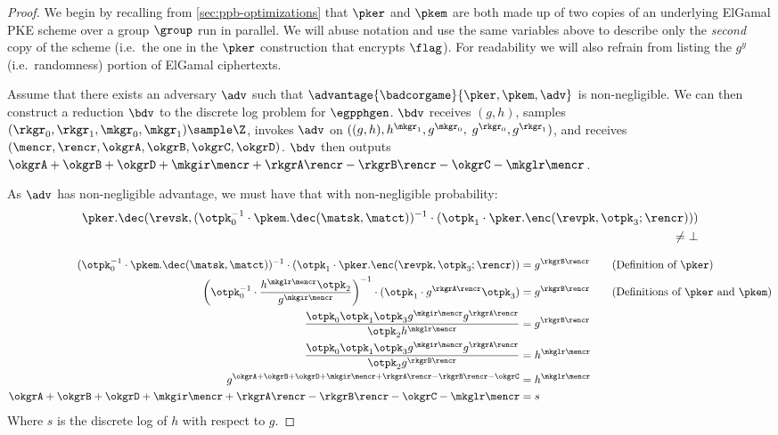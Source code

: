 \begin{proof}
	We begin by recalling from \cref{sec:ppb-optimizations} that $\pker$ and $\pkem$ are both made up of two copies of an underlying ElGamal PKE scheme over a group $\group$ run in parallel.
	We will abuse notation and use the same variables above to describe only the \emph{second} copy of the scheme (i.e.\ the one in the $\pker$ construction that encrypts $\flag$).
	For readability we will also refrain from listing the $g^y$ (i.e.\ randomness) portion of ElGamal ciphertexts.

	Assume that there exists an adversary $\adv$ such that $\advantage{\badcorgame}{\pker, \pkem,  \adv}$ is non-negligible.
	We can then construct a reduction $\bdv$ to the discrete log problem for $\egpphgen$.
	$\bdv$ receives $(g, h)$, samples $(\rkgr_0, \rkgr_1, \mkgr_0, \mkgr_1) \sample \Z$, invokes $\adv$ on $((g, h), h^{\mkgr_1}, g^{\mkgr_0},$ $g^{\rkgr_0}, g^{\rkgr_1})$, and receives $(\mencr, \rencr, \okgrA, \okgrB, \okgrC, \okgrD)$.
	$\bdv$ then outputs $\okgrA + \okgrB + \okgrD + \mkgir\mencr + \rkgrA\rencr - \rkgrB\rencr - \okgrC - \mkglr\mencr$.

	As $\adv$ has non-negligible advantage, we must have that with non-negligible probability:
	\begin{align*}
		\pker.\dec(\revsk, (\otpk_0^{-1} \cdot \pkem.\dec(\matsk, \matct))^{-1} \cdot (\otpk_1 \cdot \pker.\enc(\revpk, \otpk_3; \rencr))) & \\
		\neq \bot                                                                                                                          &
	\end{align*}

	\vspace{-2em}
	\begin{align*}
		(\otpk_0^{-1} \cdot \pkem.\dec(\matsk, \matct))^{-1} \cdot (\otpk_1 \cdot \pker.\enc(\revpk, \otpk_3; \rencr))                      & = g^{\rkgrB\rencr} \tag{Definition of $\pker$}              \\
		\left(\otpk_0^{-1} \cdot \frac{h^{\mkglr\mencr}\otpk_2}{g^{\mkgir\mencr}}\right)^{-1} \cdot (\otpk_1 \cdot g^{\rkgrA\rencr}\otpk_3) & = g^{\rkgrB\rencr} \tag{Definitions of $\pker$ and $\pkem$} \\
		\frac{\otpk_0\otpk_1\otpk_3 g^{\mkgir\mencr}g^{\rkgrA\rencr}}{\otpk_2h^{\mkglr\mencr}}                                              & = g^{\rkgrB\rencr}                                          \\
		\frac{\otpk_0\otpk_1\otpk_3 g^{\mkgir\mencr}g^{\rkgrA\rencr}}{\otpk_2g^{\rkgrB\rencr}}                                              & = h^{\mkglr\mencr}                                          \\
		g^{\okgrA + \okgrB + \okgrD + \mkgir\mencr + \rkgrA\rencr - \rkgrB\rencr - \okgrC}                                                  & = h^{\mkglr\mencr}                                          \\
		\okgrA + \okgrB + \okgrD + \mkgir\mencr + \rkgrA\rencr - \rkgrB\rencr - \okgrC - \mkglr\mencr                                       & = s
	\end{align*}
	Where $s$ is the discrete log of $h$ with respect to $g$.


\end{proof}
